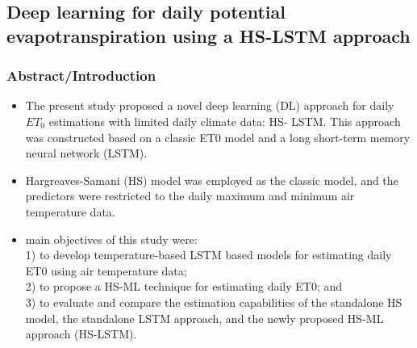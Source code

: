 \documentclass[paper=a4, fontsize=12pt]{scrartcl}
\begin{document}
	\newpage
	\subsection{Deep learning for daily potential evapotranspiration using a HS-LSTM approach \citep{yan2023deep}}
		\subsubsection{Abstract/Introduction}
	\begin{itemize}
		\item The present study proposed a novel deep learning (DL) approach for daily $ET_0$ estimations with limited daily climate data: HS- LSTM. This approach was constructed based on a classic ET0 model and a long short-term memory neural network (LSTM).
		\item Hargreaves-Samani (HS) model was employed as the classic model, and the predictors were restricted to the daily maximum and minimum air temperature data.
		\item main objectives of this study were:\\
		 1) to develop temperature-based LSTM based models for estimating daily ET0 using air temperature data;\\ 
		 2) to propose a HS-ML technique for estimating daily ET0; and\\
		 3) to evaluate and compare the estimation capabilities of the standalone HS model, the standalone LSTM approach, and the newly proposed HS-ML approach (HS-LSTM).
	\end{itemize}
	
\end{document}
